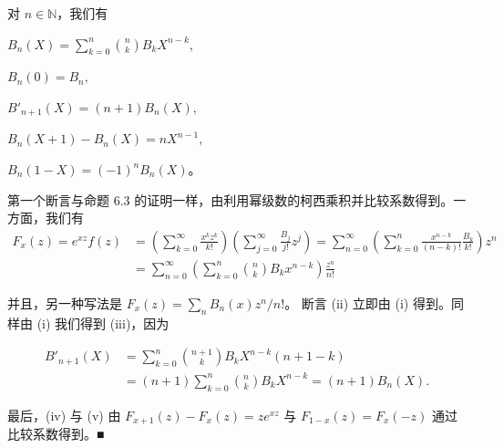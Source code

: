 \begin{proposition}

对 $ n \in \mathbb{N} $，我们有

\begin{subitems}
\item

$ B_n(X) = \sum_{k=0}^{n}\binom{n}{k}B_k X^{n-k} , $

\item

$ B_n(0) = B_n , $

\item

$ B'_{n+1}(X) = (n+1)B_n(X) , $

\item

$ B_n(X + 1) - B_n(X) = nX^{n-1} , $

\item

$ B_n(1 - X) = (-1)^n B_n(X) $。

\proofhead
第一个断言与命题 6.3 的证明一样，由利用幂级数的柯西乘积并比较系数得到。一方面，我们有
\begin{equation*}
\begin{aligned}
F_x(z) = e^{xz}f(z) &= \left( \sum_{k=0}^{\infty}\frac{x^k z^k}{k!} \right)\left( \sum_{j=0}^{\infty}\frac{B_j}{j!}z^j \right) = \sum_{n=0}^{\infty}\left( \sum_{k=0}^{n}\frac{x^{n-k}}{(n-k)!}\frac{B_k}{k!} \right)z^n \\ &= \sum_{n=0}^{\infty}\left( \sum_{k=0}^{n}\binom{n}{k}B_k x^{n-k} \right)\frac{z^n}{n!}
\end{aligned}
\end{equation*}

并且，另一种写法是 $ F_x(z) = \sum_n B_n(x)z^n/n! $。
断言 (ii) 立即由 (i) 得到。同样由 (i) 我们得到 (iii)，因为

\begin{equation*}
\begin{aligned}
B'_{n+1}(X) &= \sum_{k=0}^{n}\binom{n+1}{k}B_k X^{n-k}(n+1-k) \\ &= (n+1)\sum_{k=0}^{n}\binom{n}{k}B_k X^{n-k} = (n+1)B_n(X) .
\end{aligned}
\end{equation*}

最后，(iv) 与 (v) 由 $ F_{x+1}(z) - F_x(z) = ze^{xz} $ 与 $ F_{1-x}(z) = F_x(-z) $ 通过比较系数得到。\nobreak\hspace{0.35em}■

\end{subitems}

\end{proposition}

